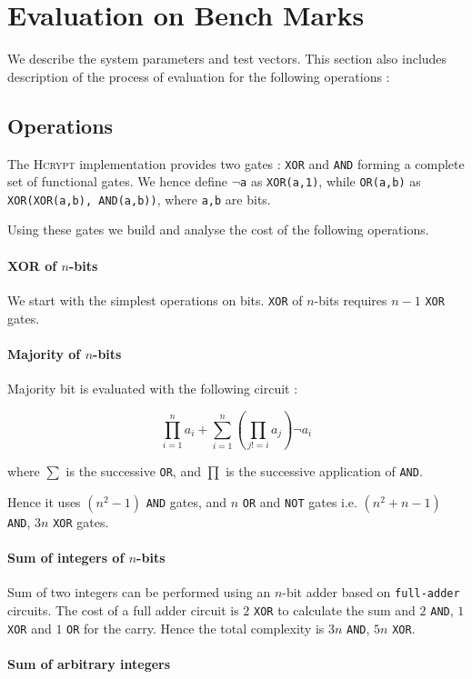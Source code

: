 \documentclass{acm_proc_article-sp}
\begin{document}
\section{Evaluation on Bench Marks}

We describe the system parameters and test vectors. This section also includes description of the process of evaluation for the following operations :


\subsection{Operations}

The \textsc{Hcrypt} implementation provides two gates : \texttt{XOR} and \texttt{AND} forming a complete set of functional gates. We hence define $\neg$\texttt{a} as \texttt{XOR(a,1)}, while \texttt{OR(a,b)} as \texttt{XOR(XOR(a,b), AND(a,b))}, where \texttt{a,b} are bits. 

Using these gates we build and analyse the cost of the following operations.

\paragraph{XOR of $n$-bits}
We start with the simplest operations on bits. \texttt{XOR} of $n$-bits requires $n-1$ \texttt{XOR} gates. 
\paragraph{Majority of $n$-bits} 
Majority bit is evaluated with the following circuit : 

\[\prod_{i=1}^{n}{a_i}+\sum_{i=1}^{n}{(\prod_{j!=i}{a_j}) \neg a_i}\]

where $\sum$ is the successive \texttt{OR}, and $\prod$ is the successive application of \texttt{AND}.

Hence it uses $(n^2-1)$ \texttt{AND} gates, and $n$ \texttt{OR} and \texttt{NOT} gates i.e. $(n^2+n-1)$ \texttt{AND}, $3n$ \texttt{XOR} gates.
\paragraph{Sum of integers of $n$-bits} Sum of two integers can be performed using an $n$-bit adder based on \texttt{full-adder} circuits. The cost of a full adder circuit is $2$ \texttt{XOR} to calculate the sum and $2$ \texttt{AND}, $1$ \texttt{XOR} and $1$ \texttt{OR} for the carry. Hence the total complexity is $3n$ \texttt{AND}, $5n$ \texttt{XOR}. 
\paragraph{Sum of arbitrary integers}
\end{document}
